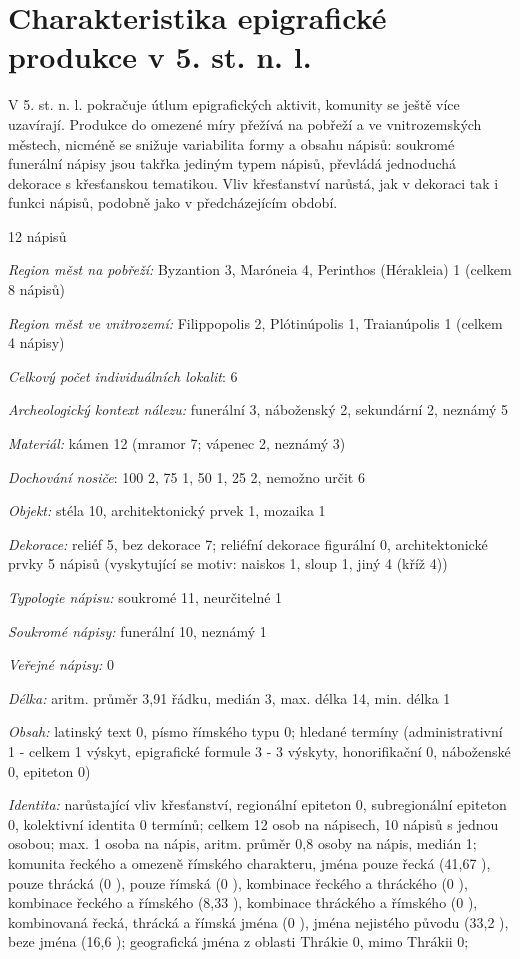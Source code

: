 \section[charakteristika-epigrafické-produkce-v-5.-st.-n.-l.]{Charakteristika epigrafické produkce v 5. st. n. l.}

V 5. st. n. l. pokračuje útlum epigrafických aktivit, komunity se ještě více uzavírají. Produkce do omezené míry přežívá na pobřeží a ve vnitrozemských městech, nicméně se snižuje variabilita formy a obsahu nápisů: soukromé funerální nápisy jsou takřka jediným typem nápisů, převládá jednoduchá dekorace s křesťanskou tematikou. Vliv křesťanství narůstá, jak v dekoraci tak i funkci nápisů, podobně jako v předcházejícím období.

\placetable[none]{}
\starttable[|l|]
\HL
{} 12 nápisů

{\em Region měst na pobřeží:} Byzantion 3, Maróneia 4, Perinthos (Hérakleia) 1 (celkem 8 nápisů)

{\em Region měst ve vnitrozemí:} Filippopolis 2, Plótinúpolis 1, Traianúpolis 1 (celkem 4 nápisy)

{\em Celkový počet individuálních lokalit}: 6

{\em Archeologický kontext nálezu:} funerální 3, náboženský 2, sekundární 2, neznámý 5

{\em Materiál:} kámen 12 (mramor 7; vápenec 2, neznámý 3)

{\em Dochování nosiče}: 100  2, 75  1, 50  1, 25  2, nemožno určit 6

{\em Objekt:} stéla 10, architektonický prvek 1, mozaika 1

{\em Dekorace:} reliéf 5, bez dekorace 7; reliéfní dekorace figurální 0, architektonické prvky 5 nápisů (vyskytující se motiv: naiskos 1, sloup 1, jiný 4 (kříž 4))

{\em Typologie nápisu:} soukromé 11, neurčitelné 1

{\em Soukromé nápisy:} funerální 10, neznámý 1

{\em Veřejné nápisy:} 0

{\em Délka:} aritm. průměr 3,91 řádku, medián 3, max. délka 14, min. délka 1

{\em Obsah:} latinský text 0, písmo římského typu 0; hledané termíny (administrativní 1 - celkem 1 výskyt, epigrafické formule 3 - 3 výskyty, honorifikační 0, náboženské 0, epiteton 0)

{\em Identita:} narůstající vliv křesťanství, regionální epiteton 0, subregionální epiteton 0, kolektivní identita 0 termínů; celkem 12 osob na nápisech, 10 nápisů s jednou osobou; max. 1 osoba na nápis, aritm. průměr 0,8 osoby na nápis, medián 1; komunita řeckého a omezeně římského charakteru, jména pouze řecká (41,67 ), pouze thrácká (0 ), pouze římská (0 ), kombinace řeckého a thráckého (0 ), kombinace řeckého a římského (8,33 ), kombinace thráckého a římského (0 ), kombinovaná řecká, thrácká a římská jména (0 ), jména nejistého původu (33,2 ), beze jména (16,6 ); geografická jména z oblasti Thrákie 0, mimo Thrákii 0;

